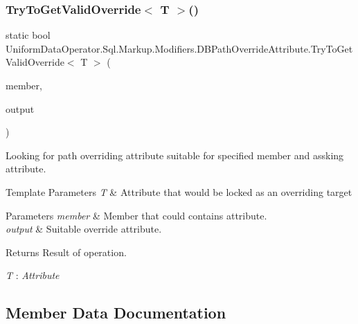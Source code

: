 \subsubsection{\texorpdfstring{Try\+To\+Get\+Valid\+Override$<$ T $>$()}{TryToGetValidOverride< T >()}}
{\footnotesize\ttfamily static bool Uniform\+Data\+Operator.\+Sql.\+Markup.\+Modifiers.\+D\+B\+Path\+Override\+Attribute.\+Try\+To\+Get\+Valid\+Override$<$ T $>$ (\begin{DoxyParamCaption}\item[{Member\+Info}]{member,  }\item[{out \mbox{\hyperlink{class_uniform_data_operator_1_1_sql_1_1_markup_1_1_modifiers_1_1_d_b_path_override_attribute}{D\+B\+Path\+Override\+Attribute}}}]{output }\end{DoxyParamCaption})\hspace{0.3cm}{\ttfamily [static]}}



Looking for path overriding attribute suitable for specified member and assking attribute. 


\begin{DoxyTemplParams}{Template Parameters}
{\em T} & Attribute that would be locked as an overriding target\\
\hline
\end{DoxyTemplParams}

\begin{DoxyParams}{Parameters}
{\em member} & Member that could contains attribute.\\
\hline
{\em output} & Suitable override attribute.\\
\hline
\end{DoxyParams}
\begin{DoxyReturn}{Returns}
Result of operation.
\end{DoxyReturn}
\begin{Desc}
\item[Type Constraints]\begin{description}
\item[{\em T} : {\em Attribute}]\end{description}
\end{Desc}


\subsection{Member Data Documentation}
\mbox{\label{class_uniform_data_operator_1_1_sql_1_1_markup_1_1_modifiers_1_1_d_b_path_override_attribute_a30bd9209a06db42db371c857573af3be}} 
